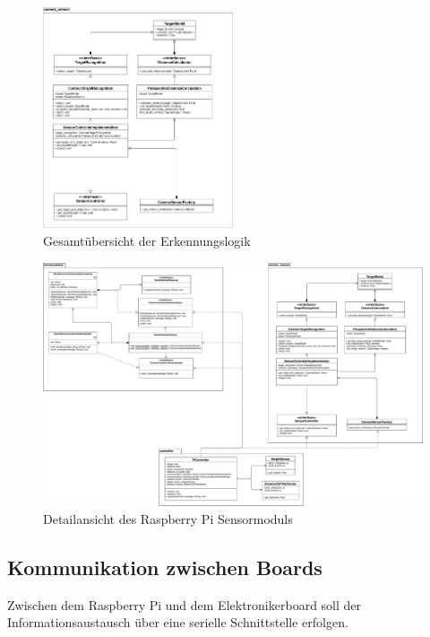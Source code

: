 \documentclass[a4paper]{report}
\begin{document}
\begin{figure}[h!]
	\centering
	\includegraphics[keepaspectratio,width=0.5\textwidth]{pi-sensor_cs}
	\caption{Gesamtübersicht der Erkennungslogik}
	\label{fig:KameraSensor}
\end{figure}

\begin{landscape}

\begin{figure}[h!]
	\centering
	\includegraphics[keepaspectratio,width=\linewidth]{pi-sensor}
	\caption{Detailansicht des Raspberry Pi Sensormoduls}
	\label{fig:PiSensor}
\end{figure}

\end{landscape}

\subsection{Kommunikation zwischen Boards}
\label{ssec:Kommunikation}
Zwischen dem Raspberry Pi und dem Elektronikerboard soll der Informationsaustausch über eine serielle Schnittstelle erfolgen.
\end{document}
